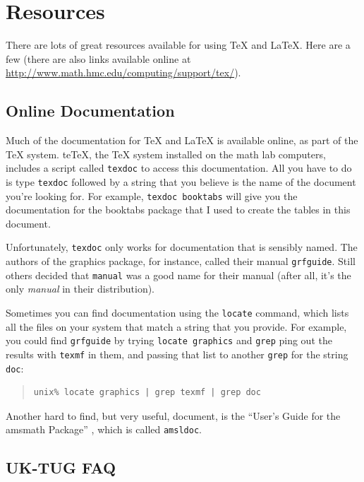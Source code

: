 \documentclass{icmmcm}
\newcommand{\file}[1]{\texttt{#1}\xspace}
\newcommand{\package}[1]{\textsf{#1}\xspace}
\newcommand{\prog}[1]{\texttt{#1}\xspace}
\newcommand{\tex}{\TeX\xspace}
\newcommand{\latex}{\LaTeX\xspace}
\begin{document}
{\section{Resources}

There are lots of great resources available for using \tex and \latex.
Here are a few (there are also links available online at
\url{http://www.math.hmc.edu/computing/support/tex/}).


\subsection{Online Documentation}

Much of the documentation for \tex and \latex is available online, as
part of the \tex system.  te\tex, the \tex system installed on the
math lab computers, includes a script called \prog{texdoc} to access
this documentation.  All you have to do is type \prog{texdoc} followed
by a string that you believe is the name of the document you're
looking for.  For example, \prog{texdoc booktabs} will give you the
documentation for the \package{booktabs} package that I used to create
the tables in this document.

Unfortunately, \prog{texdoc} only works for documentation that is
sensibly named.  The authors of the \package{graphics} package, for
instance, called their manual \file{grfguide}.  Still others decided
that \file{manual} was a good name for their manual (after all, it's
the only \emph{manual} in their distribution).

Sometimes you can find documentation using the \prog{locate} command,
which lists all the files on your system that match a string that you
provide.  For example, you could find \file{grfguide} by trying
\prog{locate graphics} and \prog{grep}ping out the results with
\file{texmf} in them, and passing that list to another \prog{grep} for
the string \file{doc}:
\begin{quote}
\begin{verbatim}
unix% locate graphics | grep texmf | grep doc
\end{verbatim}
\end{quote}

Another hard to find, but very useful, document, is the ``User's Guide
for the \package{amsmath} Package'' \citeyearpar{amsmath-doc}, which
is called \file{amsldoc}.


\subsection{UK-TUG FAQ}

}
\end{document}

